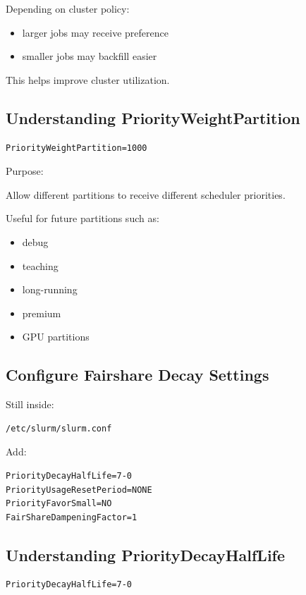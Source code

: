 \documentclass[11pt]{article}
\begin{document}
Depending on cluster policy:

\begin{itemize}
\item larger jobs may receive preference
\item smaller jobs may backfill easier
\end{itemize}

This helps improve cluster utilization.
\subsection{Understanding PriorityWeightPartition}
\label{sec:org46c95c2}

\begin{verbatim}
PriorityWeightPartition=1000
\end{verbatim}

Purpose:

Allow different partitions to receive different scheduler priorities.

Useful for future partitions such as:

\begin{itemize}
\item debug
\item teaching
\item long-running
\item premium
\item GPU partitions
\end{itemize}
\subsection{Configure Fairshare Decay Settings}
\label{sec:org23ccc7e}

Still inside:

\begin{verbatim}
/etc/slurm/slurm.conf
\end{verbatim}

Add:

\begin{verbatim}
PriorityDecayHalfLife=7-0
PriorityUsageResetPeriod=NONE
PriorityFavorSmall=NO
FairShareDampeningFactor=1
\end{verbatim}
\subsection{Understanding PriorityDecayHalfLife}
\label{sec:org0b828a8}

\begin{verbatim}
PriorityDecayHalfLife=7-0
\end{verbatim}
\end{document}

